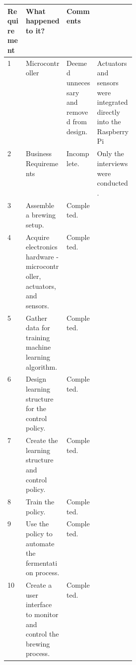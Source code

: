\begin{center}
\begin{tabular}{lll p{0.3\linewidth} }
	Requirement & What happened to it? & Comments \\
	\hline
	1 & Microcontroller & Deemed unnecessary and removed from design. & Actuators and sensors  were integrated directly into the Raspberry Pi \\
	2 & Business Requirements & Incomplete. & Only the interviews were conducted. \\
	3 & Assemble a brewing setup. & Completed.\\
	4 & Acquire electronics hardware - microcontroller, actuators, and sensors. & Completed.\\
	5 & Gather data for training machine learning algorithm. & Completed.\\
	6 & Design learning structure for the control policy. & Completed.\\
	7 & Create the learning structure and control policy. & Completed.\\
	8 & Train the policy. & Completed.\\
	9 & Use the policy to automate the fermentation process. & Completed.\\
	10 &  Create a user interface to monitor and control the brewing process. & Completed.\\
\end{tabular}
\end{center}

